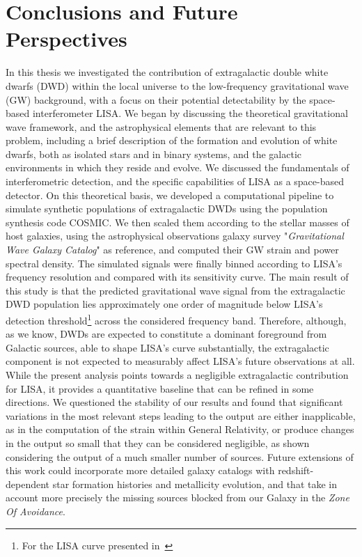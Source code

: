 \chapter*{Conclusions and Future Perspectives}
In this thesis we investigated the contribution of extragalactic double white dwarfs (DWD) within the local universe to the low-frequency gravitational wave (GW) background, with a focus on their potential detectability by the space-based interferometer LISA.
We began by discussing the theoretical gravitational wave framework, and the astrophysical elements that are relevant to this problem, including a brief description of the formation and evolution of white dwarfs, both as isolated stars and in binary systems, and the galactic environments in which they reside and evolve.
We discussed the fundamentals of interferometric detection, and the specific capabilities of LISA as a space-based detector.  
On this theoretical basis, we developed a computational pipeline to simulate synthetic populations of extragalactic DWDs using the population synthesis code COSMIC.
We then scaled them according to the stellar masses of host galaxies, using the astrophysical observations galaxy survey "\textit{Gravitational Wave Galaxy Catalog}" as reference, and computed their GW strain and power spectral density.
The simulated signals were finally binned according to LISA’s frequency resolution and compared with its sensitivity curve.
The main result of this study is that the predicted gravitational wave signal from the extragalactic DWD population lies approximately one order of magnitude below LISA’s detection threshold\footnote{For the LISA curve presented in~\cite{Robson_2019}} across the considered frequency band.
Therefore, although, as we know, DWDs are expected to constitute a dominant foreground from Galactic sources, able to shape LISA's curve substantially, the extragalactic component is not expected to measurably affect LISA's future observations at all.
While the present analysis points towards a negligible extragalactic contribution for LISA, it provides a quantitative baseline that can be refined in some directions.
We questioned the stability of our results and found that significant variations in the most relevant steps leading to the output are either inapplicable, as in the computation of the strain within General Relativity, or produce changes in the output so small that they can be considered negligible, as shown considering the output of a much smaller number of sources.
Future extensions of this work could incorporate more detailed galaxy catalogs with redshift-dependent star formation histories and metallicity evolution, and that take in account more precisely the missing sources blocked from our Galaxy in the \textit{Zone Of Avoidance}.

